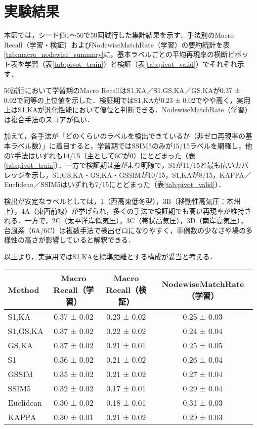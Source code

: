 \documentclass{jarticle}
\theoremstyle{definition}
\begin{document}
\section{実験結果}
本節では，シード値1〜50で50回試行した集計結果を示す．手法別のMacro Recall（学習・検証）およびNodewiseMatchRate（学習）の要約統計を表\ref{tab:macro_nodewise_summary}に，基本ラベルごとの平均再現率の横断ピボット表を学習（表\ref{tab:pivot_train}）と検証（表\ref{tab:pivot_valid}）でそれぞれ示す．

50試行において学習期のMacro RecallはS1,KA／S1,GS,KA／GS,KAが0.37 ± 0.02で同等の上位値を示した．検証期ではS1,KAが0.23 ± 0.02でやや高く，実用上はS1,KAが汎化性能において優位と判断できる．NodewiseMatchRate（学習）は複合手法のスコアが低い．

加えて，各手法が「どのくらいのラベルを検出できているか（非ゼロ再現率の基本ラベル数）」に着目すると，学習期ではSSIM5のみが15/15ラベルを網羅し，他の7手法はいずれも14/15（主として6Cが0）にとどまった（表\ref{tab:pivot_train}）．一方で検証期は差がより明瞭で，S1が11/15と最も広いカバレッジを示し，S1,GS,KA・GS,KA・GSSIMが10/15，S1,KAが8/15，KAPPA／Euclidean／SSIM5はいずれも7/15にとどまった（表\ref{tab:pivot_valid}）．

検出が安定なラベルとしては，1（西高東低冬型），3B（移動性高気圧：本州上），4A（東西前線）が挙げられ，多くの手法で検証期でも高い再現率が維持される．一方で，2C（太平洋岸低気圧），3C（帯状高気圧），3D（南岸高気圧），台風系（6A/6C）は複数手法で検出ゼロになりやすく，事例数の少なさや場の多様性の高さが影響していると解釈できる．

以上より，実運用ではS1,KAを標準距離とする構成が妥当と考える．

\begin{table*}[t]
\centering
\caption{手法別 Macro Recall（学習・検証）と NodewiseMatchRate（学習）の統計量（平均±標準偏差, N=50）}
\label{tab:macro_nodewise_summary}
\begin{tabular}{lccc}
\hline
Method & Macro Recall（学習） & Macro Recall（検証） & NodewiseMatchRate（学習） \\
\hline
S1,KA      & 0.37 ± 0.02 & 0.23 ± 0.02 & 0.25 ± 0.03 \\
S1,GS,KA   & 0.37 ± 0.02 & 0.22 ± 0.02 & 0.24 ± 0.04 \\
GS,KA      & 0.37 ± 0.02 & 0.21 ± 0.01 & 0.25 ± 0.05 \\
S1         & 0.36 ± 0.02 & 0.21 ± 0.02 & 0.26 ± 0.04 \\
GSSIM      & 0.35 ± 0.02 & 0.21 ± 0.02 & 0.27 ± 0.04 \\
SSIM5      & 0.32 ± 0.02 & 0.17 ± 0.01 & 0.29 ± 0.04 \\
Euclidean  & 0.30 ± 0.02 & 0.18 ± 0.01 & 0.31 ± 0.03 \\
KAPPA      & 0.30 ± 0.01 & 0.21 ± 0.02 & 0.29 ± 0.03 \\
\hline
\end{tabular}
\end{table*}
\end{document}
